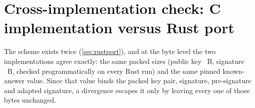\section{Cross-implementation check: C implementation versus Rust port}
\label{sec:res-rust}

The scheme exists twice (\cref{sec:rustport}), and at the byte level the two
implementations agree exactly: the same packed
sizes (public key \pkBytesTarget{}~B, signature \sigBytesTarget{}~B, checked
programmatically on every Rust run) and the same pinned known-answer value.
Since that value binds the packed key
pair, signature, pre-signature and adapted signature, a divergence escapes it only by
leaving every one of those bytes unchanged.

\begin{table}[htbp]
  \centering
  \caption[Per-operation timing: C implementation vs Rust port]{Per-operation timing of the
  two implementations at the target setting, \emph{Simplified Dilithium-III}
  ($\mu$s per operation). The C and Rust columns come from the two protocol drivers,
  which deliberately mirror each other (same repetition scheme of \benchReps{}
  repetitions $\times$ \benchItersSign{}/\benchItersVerify{} iterations, fixed
  public-parameter seed, fixed message, same success-path gating), so they are directly
  comparable. The final column is the independent Criterion.rs statistical harness
  (\critSamples{} samples per operation, bootstrap 95\% confidence interval of the
  mean); its hot-loop protocol yields lower absolute times, and it is included to show
  that the \emph{relative} conclusions do not depend on the hand-rolled driver.}
  \label{tab:rust}
  \small
  
\end{table}

